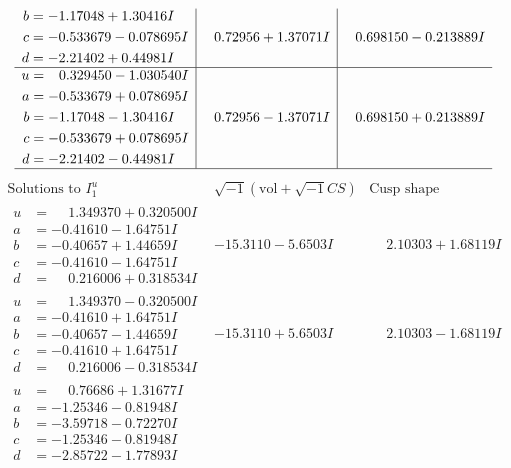 \documentclass[1p]{elsarticle_modified}
\theoremstyle{definition}
\newcommand{\I}{\sqrt{-1}}
\begin{document}
$$\begin{array}{c|c|c}
\begin{aligned}
b &= -1.17048 + 1.30416 I \\
c &= -0.533679 - 0.078695 I \\
d &= -2.21402 + 0.44981 I\end{aligned}
 & \phantom{-}0.72956 + 1.37071 I & \phantom{-}0.698150 - 0.213889 I \\ \hline\begin{aligned}
u &= \phantom{-}0.329450 - 1.030540 I \\
a &= -0.533679 + 0.078695 I \\
b &= -1.17048 - 1.30416 I \\
c &= -0.533679 + 0.078695 I \\
d &= -2.21402 - 0.44981 I\end{aligned}
 & \phantom{-}0.72956 - 1.37071 I & \phantom{-}0.698150 + 0.213889 I\\
 \hline 
 \end{array}$$\newpage$$\begin{array}{c|c|c}  
\text{Solutions to }I^u_{1}& \I (\text{vol} + \sqrt{-1}CS) & \text{Cusp shape}\\
 \hline 
\begin{aligned}
u &= \phantom{-}1.349370 + 0.320500 I \\
a &= -0.41610 - 1.64751 I \\
b &= -0.40657 + 1.44659 I \\
c &= -0.41610 - 1.64751 I \\
d &= \phantom{-}0.216006 + 0.318534 I\end{aligned}
 & -15.3110 - 5.6503 I & \phantom{-}2.10303 + 1.68119 I \\ \hline\begin{aligned}
u &= \phantom{-}1.349370 - 0.320500 I \\
a &= -0.41610 + 1.64751 I \\
b &= -0.40657 - 1.44659 I \\
c &= -0.41610 + 1.64751 I \\
d &= \phantom{-}0.216006 - 0.318534 I\end{aligned}
 & -15.3110 + 5.6503 I & \phantom{-}2.10303 - 1.68119 I \\ \hline\begin{aligned}
u &= \phantom{-}0.76686 + 1.31677 I \\
a &= -1.25346 - 0.81948 I \\
b &= -3.59718 - 0.72270 I \\
c &= -1.25346 - 0.81948 I \\
d &= -2.85722 - 1.77893 I\end{aligned}

\end{array}$$
\end{document}
